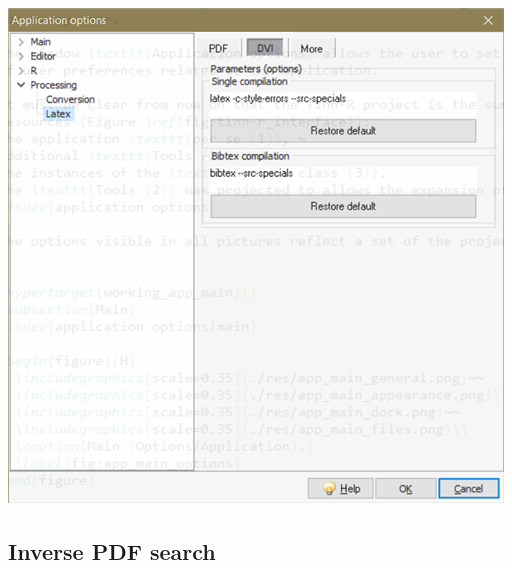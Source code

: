 \begin{itemize}
\begin{itemize}
        \includegraphics[scale=0.60]{./res/app_processing_latex_dvi.png}\\
    \end{itemize}
\end{itemize}


\subsection{Inverse PDF search}

